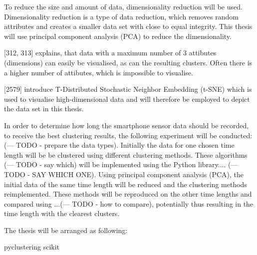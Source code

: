 \documentclass[12pt,a4paper]{article}
\begin{document}

To reduce the size and amount of data, dimensionality reduction will be used. Dimensionality reduction is a type of data reduction, which removes random attributes and creates a smaller data set with close to equal integrity. This thesis will use principal component analysis (PCA) to reduce the dimensionality.


\textcite{bramer2007principles}[312, 313] explains, that data with a maximum number of 3 attibutes (dimensions) can easily be visualised, as can the resulting clusters. Often there is a higher number of attibutes, which is impossible to visualise.

\textcite{maaten2008visualizing}[2579] introduce T-Distributed Stochastic Neighbor Embedding (t-SNE) which is used to visualise high-dimensional data and will therefore be employed to depict the data set in this thesis.  

In order to determine how long the smartphone sensor data should be recorded, to receive the best clustering results, the following experiment will be conducted: (--- TODO - prepare the data types). Initially the data for one chosen time length will be be clustered using different clustering methods. These algorithms (--- TODO - say which) will be implemented using the Python library.... (--- TODO - SAY WHICH ONE). Using principal component analysis (PCA), the initial data of the same time length will be reduced and the clustering methods reimplemented. These methods will be reproduced on the other time lengths and compared using ...(--- TODO - how to compare), potentially thus resulting in the time length with the clearest clusters. 

The thesis will be arranged as following:


pyclustering
scikit







\end{document}

